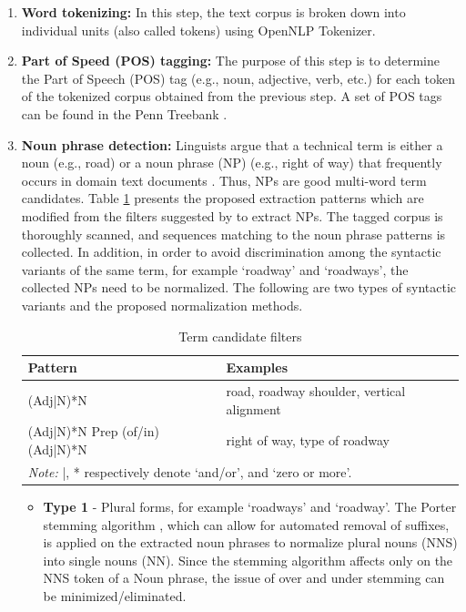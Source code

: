 \documentclass[Journal,InsideFigs, DoubleSpace]{ascelike} %
\begin{document}
\begin{enumerate} [label=\roman*]
	\item \textbf{Word tokenizing:} In this step, the text corpus is broken down into individual units (also called tokens) using OpenNLP Tokenizer.
	\item \textbf{Part of Speed (POS) tagging:} The purpose of this step is to determine the Part of Speech (POS) tag (e.g., noun, adjective, verb, etc.) for each token of the tokenized corpus obtained from the previous step. A set of POS tags can be found in the Penn Treebank \cite{marcus93}.
	\item \textbf{Noun phrase detection:} Linguists argue that a technical term is either a noun (e.g., road) or a noun phrase (NP) (e.g., right of way) that frequently occurs in domain text documents \cite{justeson95}. Thus, NPs are good multi-word term candidates. Table \ref{table:term_filter} presents the proposed extraction patterns which are modified from the filters suggested by  to extract NPs. The tagged corpus is thoroughly scanned, and sequences matching to the noun phrase patterns is collected. 
	In addition, in order to avoid discrimination among the syntactic variants of the same term, for example `roadway' and `roadways', the collected NPs need to be normalized. The following are two types of syntactic variants and the proposed normalization methods.
	\begin{table} [t]
		\caption{Term candidate filters}
		\label{table:term_filter}
		\centering
		\small
		\renewcommand{\arraystretch}{1.25}
		\begin{tabular}{l l}
			\hline
			\textbf{Pattern} & \textbf{Examples}\\
			\hline
			(Adj|N)*N		& road, roadway shoulder, vertical alignment\\
			(Adj|N)*N Prep (of/in) (Adj|N)*N	&	right of way, type of roadway\\
			\hline
			\multicolumn{2}{l}{\textit{Note:} |, * respectively denote `and/or', and `zero or more'.  } \\
			\hline
		\end{tabular}
		\normalsize
	\end{table}
	\begin{itemize}
		\item \textbf{Type 1} - Plural forms, for example `roadways' and `roadway'. The Porter stemming algorithm \cite{porter80}, which can allow for automated removal of suffixes, is applied on the extracted noun phrases to normalize plural nouns (NNS) into single nouns (NN). Since the stemming algorithm affects only on the NNS token of a Noun phrase, the issue of over and under stemming can be minimized/eliminated. %

\end{itemize}
\end{enumerate}
\end{document}
